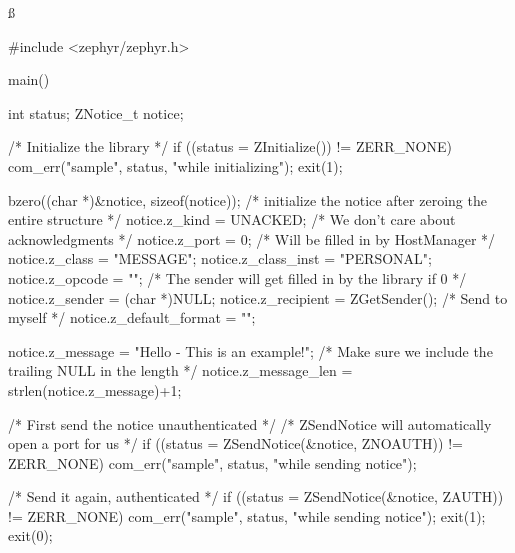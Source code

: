 \ss
\begin{code}
#include <zephyr/zephyr.h>

main()
{
    int status;
    ZNotice_t notice;

    /* Initialize the library */
    if ((status = ZInitialize()) != ZERR_NONE) {
        com_err("sample", status, "while initializing");
        exit(1);
    }

    bzero((char *)&notice, sizeof(notice));
    /* initialize the notice after zeroing the entire structure */
    notice.z_kind = UNACKED;    /* We don't care about acknowledgments */
    notice.z_port = 0;  /* Will be filled in by HostManager */
    notice.z_class = "MESSAGE";
    notice.z_class_inst = "PERSONAL";
    notice.z_opcode = "";
    /* The sender will get filled in by the library if 0 */
    notice.z_sender = (char *)NULL;
    notice.z_recipient = ZGetSender(); /* Send to myself */
    notice.z_default_format = "";

    notice.z_message = "Hello - This is an example!";
    /* Make sure we include the trailing NULL in the length */
    notice.z_message_len = strlen(notice.z_message)+1;

    /* First send the notice unauthenticated */
    /* ZSendNotice will automatically open a port for us */
    if ((status = ZSendNotice(&notice, ZNOAUTH)) != ZERR_NONE)
        com_err("sample", status, "while sending notice");

    /* Send it again, authenticated */
    if ((status = ZSendNotice(&notice, ZAUTH)) != ZERR_NONE) {
        com_err("sample", status, "while sending notice");
        exit(1);
    }
    exit(0);
}
\end{code}
\ess
